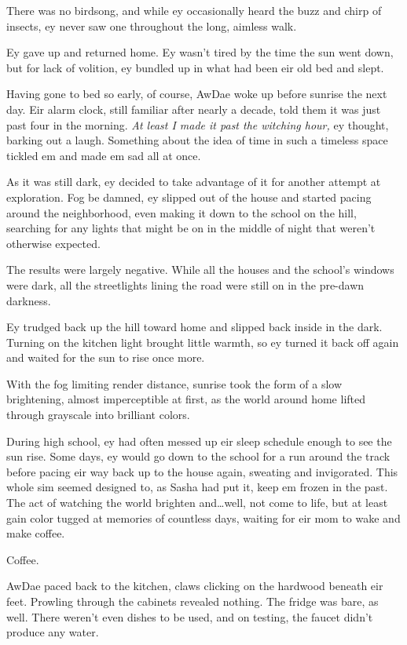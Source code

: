There was no birdsong, and while ey occasionally heard the buzz and chirp of insects, ey never saw one throughout the long, aimless walk.

Ey gave up and returned home. Ey wasn't tired by the time the sun went down, but for lack of volition, ey bundled up in what had been eir old bed and slept.

Having gone to bed so early, of course, AwDae woke up before sunrise the next day. Eir alarm clock, still familiar after nearly a decade, told them it was just past four in the morning. \emph{At least I made it past the witching hour,} ey thought, barking out a laugh. Something about the idea of time in such a timeless space tickled em and made em sad all at once.

As it was still dark, ey decided to take advantage of it for another attempt at exploration. Fog be damned, ey slipped out of the house and started pacing around the neighborhood, even making it down to the school on the hill, searching for any lights that might be on in the middle of night that weren't otherwise expected.

The results were largely negative. While all the houses and the school's windows were dark, all the streetlights lining the road were still on in the pre-dawn darkness.

Ey trudged back up the hill toward home and slipped back inside in the dark. Turning on the kitchen light brought little warmth, so ey turned it back off again and waited for the sun to rise once more.

With the fog limiting render distance, sunrise took the form of a slow brightening, almost imperceptible at first, as the world around home lifted through grayscale into brilliant colors.

During high school, ey had often messed up eir sleep schedule enough to see the sun rise. Some days, ey would go down to the school for a run around the track before pacing eir way back up to the house again, sweating and invigorated. This whole sim seemed designed to, as Sasha had put it, keep em frozen in the past. The act of watching the world brighten and\ldots{}well, not come to life, but at least gain color tugged at memories of countless days, waiting for eir mom to wake and make coffee.

Coffee.

AwDae paced back to the kitchen, claws clicking on the hardwood beneath eir feet. Prowling through the cabinets revealed nothing. The fridge was bare, as well. There weren't even dishes to be used, and on testing, the faucet didn't produce any water.

